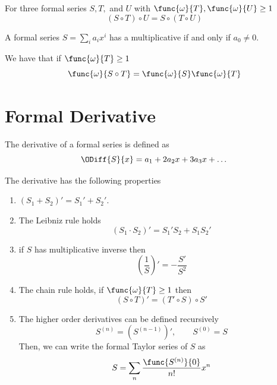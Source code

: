 \begin{proposition}
    For three formal series \(S, T,\) and \(U\) with \(\func{\omega}{T},\func{\omega}{U} \geq 1\)
    \begin{equation*}
        (S \circ T) \circ U = S \circ (T \circ U)
    \end{equation*}
\end{proposition}

\begin{proposition}
    A formal series \(S = \sum_i a_i x^i\) has a multiplicative if and only if \(a_0 \neq 0\).
\end{proposition}

\begin{proposition}
    We have that if \(\func{\omega}{T} \geq 1 \)
    \begin{equation*}
        \func{\omega}{S \circ T} = \func{\omega}{S} \func{\omega}{T}
    \end{equation*}
\end{proposition}
\section{Formal Derivative}
The derivative of a formal series is defined as 
\begin{equation*}
    \ODiff{S}{x} = a_1 + 2a_2 x + 3a_3 x + \dots 
\end{equation*}
\begin{proposition}
    The derivative has the following properties
    \begin{enumerate}
        \item \((S_1 + S_2)' = S_1' + S_2'\).
        \item The Leibniz rule holds 
        \begin{equation*}
            (S_1 \cdot S_2)' = S_1' S_2 + S_1 S_2'
        \end{equation*}
        \item if \(S\) has multiplicative inverse then 
        \begin{equation*}
            \left(\dfrac{1}{S}\right)' = - \dfrac{S'}{S^2}
        \end{equation*}
        \item The chain rule holds, if \(\func{\omega}{T} \geq 1\) then 
        \begin{equation*}
            (S \circ T)' = (T' \circ S) \circ S'
        \end{equation*}
        \item The higher order derivatives can be defined recursively 
        \begin{equation*}
            S^{(n)} = (S^{(n-1)})', \qquad S^{(0)} = S
        \end{equation*}
        Then, we can write the formal Taylor series of \(S\) as 
        \begin{equation*}
            S = \sum_n \dfrac{\func{S^{(n)}}{0}}{n!} x^n
        \end{equation*}
    \end{enumerate}
\end{proposition}

